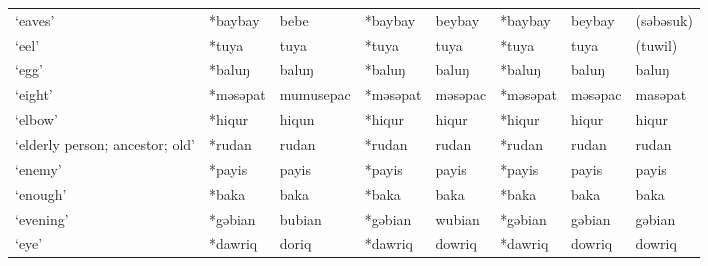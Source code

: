 \begin{landscape}
\begin{longtable}[c]{@{}p{3cm}<{\raggedright}p{2.75cm}<{\raggedright}p{2.75cm}<{\raggedright}p{2.75cm}<{\raggedright}p{2.75cm}<{\raggedright}p{2.75cm}<{\raggedright}p{2.75cm}<{\raggedright}p{2.75cm}<{\raggedright}@{}}
`eaves'                                              & *baybay            & bebe                           & *baybay            & beybay                     & *baybay          & beybay                   & (səbəsuk)                         \\
`eel'                                                & *tuya              & tuya                           & *tuya              & tuya                       & *tuya            & tuya                     & (tuwil)                           \\
`egg'                                                & *baluŋ             & baluŋ                          & *baluŋ             & baluŋ                      & *baluŋ           & baluŋ                    & baluŋ                             \\
`eight'                                              & *məsəpat           & mumusepac                      & *məsəpat           & məsəpac                    & *məsəpat         & məsəpac                  & masəpat                           \\
`elbow'                                              & *hiqur             & hiqun                          & *hiqur             & hiqur                      & *hiqur           & hiqur                    & hiqur                             \\
`elderly person; ancestor; old'                      & *rudan             & rudan                          & *rudan             & rudan                      & *rudan           & rudan                    & rudan                             \\
`enemy'                                              & *payis             & payis                          & *payis             & payis                      & *payis           & payis                    & payis                             \\
`enough'                                             & *baka              & baka                           & *baka              & baka                       & *baka            & baka                     & baka                              \\
`evening'                                            & *gəbian            & bubian                         & *gəbian            & wubian                     & *gəbian          & gəbian                   & gəbian                            \\
`eye'                                                & *dawriq            & doriq                          & *dawriq            & dowriq                     & *dawriq          & dowriq                   & dowriq                            \\

\end{longtable}
\end{landscape}
